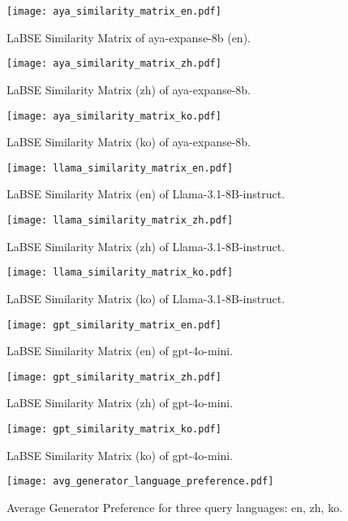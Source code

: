 \clearpage

 \begin{figure*}[ht]
  \centering
  \texttt{[image: aya\_similarity\_matrix\_en.pdf]}
  \caption{LaBSE Similarity Matrix of aya-expanse-8b (en).} 
  \label{fig:aya_lang_pref_en}
\end{figure*}

 \begin{figure*}[ht]
  \centering
  \texttt{[image: aya\_similarity\_matrix\_zh.pdf]} 
  \caption{LaBSE Similarity Matrix (zh) of aya-expanse-8b.} 
  \label{fig:aya_lang_pref_zh}
\end{figure*}

 \begin{figure*}[ht]
  \centering
  \texttt{[image: aya\_similarity\_matrix\_ko.pdf]}
  \caption{LaBSE Similarity Matrix (ko) of aya-expanse-8b.} 
  \label{fig:aya_lang_pref_ko}
\end{figure*}

 \begin{figure*}[ht]
  \centering
  \texttt{[image: llama\_similarity\_matrix\_en.pdf]}
  \caption{LaBSE Similarity Matrix (en) of Llama-3.1-8B-instruct.} 
  \label{fig:llama_lang_pref_en}
\end{figure*}

 \begin{figure*}[ht]
  \centering
  \texttt{[image: llama\_similarity\_matrix\_zh.pdf]} 
  \caption{LaBSE Similarity Matrix (zh) of Llama-3.1-8B-instruct.} 
  \label{fig:llama_lang_pref_zh}
\end{figure*}


 \begin{figure*}[ht]
  \centering
  \texttt{[image: llama\_similarity\_matrix\_ko.pdf]}
  \caption{LaBSE Similarity Matrix (ko) of Llama-3.1-8B-instruct.} 
  \label{fig:llama_lang_pref_ko}
\end{figure*}


 \begin{figure*}[ht]
  \centering
  \texttt{[image: gpt\_similarity\_matrix\_en.pdf]}
  \caption{LaBSE Similarity Matrix (en) of gpt-4o-mini.} 
  \label{fig:gpt_lang_pref_en}
\end{figure*}

 \begin{figure*}[ht]
  \centering
  \texttt{[image: gpt\_similarity\_matrix\_zh.pdf]} 
  \caption{LaBSE Similarity Matrix (zh) of gpt-4o-mini.} 
  \label{fig:gpt_lang_pref_zh}
\end{figure*}

 \begin{figure*}[ht]
  \centering
  \texttt{[image: gpt\_similarity\_matrix\_ko.pdf]}
  \caption{LaBSE Similarity Matrix (ko) of gpt-4o-mini.} 
  \label{fig:gpt_lang_pref_ko}
\end{figure*}


 \begin{figure*}[ht]
  \centering
  \texttt{[image: avg\_generator\_language\_preference.pdf]}
  \caption{Average Generator Preference for three query languages: en, zh, ko.} 
  \label{fig:avg_generator_pref}
\end{figure*}